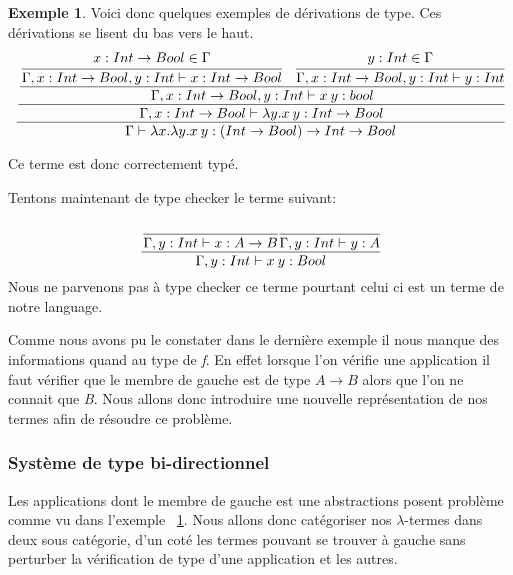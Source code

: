 \documentclass {article}
\theoremstyle{definition}
\newtheorem{example}{Exemple}
\theoremstyle{remark}
\begin{document}
\begin{example}
  \label{probleme:type_simple}
  Voici donc quelques exemples de dérivations de type.
  Ces dérivations se lisent du bas vers le haut.
  \begin{align*}
    \cfrac{
      \cfrac{
        \cfrac{
          \cfrac{x:Int\rightarrow Bool \in \Gamma}{\Gamma,x:Int\rightarrow Bool,y:Int\vdash x:Int\rightarrow Bool}\:\:\:\:%
          \cfrac{y:Int\in \Gamma}{\Gamma,x:Int\rightarrow Bool,y:Int\vdash y:Int}%
        }{\Gamma,x:Int\rightarrow Bool,y:Int\vdash \App{x}{y} : bool}%
      }{\Gamma,x:Int\rightarrow Bool\vdash \Lam{y}{\App{x}{y}}:Int \rightarrow Bool}%
    }{\Gamma\vdash \Lam{x}{\Lam{y}{\App{x}{y}}}:(Int\rightarrow Bool) \rightarrow Int \rightarrow Bool} %
  \end{align*}

  Ce terme est donc correctement typé.

  Tentons maintenant de type checker le terme suivant:
  \begin{align*}
    \cfrac{
      \cfrac{}{\Gamma,y:Int\vdash x:A\rightarrow B}%
      \cfrac{}{\Gamma,y:Int\vdash y:A}%
    }{\Gamma,y:Int\vdash\App{x}{y}:Bool}%
  \end{align*}
  Nous ne parvenons pas à type checker ce terme pourtant celui ci est un terme de notre language.
\end{example}

Comme nous avons pu le constater dans le dernière exemple il nous manque des informations
quand au type de \emph{f}. En effet lorsque l'on vérifie une application il faut 
vérifier que le membre de gauche est de type $A \rightarrow B$ alors que l'on ne connait 
que \emph{B}. Nous allons donc introduire une nouvelle représentation de nos termes 
afin de résoudre ce problème.

\subsubsection{Système de type bi-directionnel}

Les applications dont le membre de gauche est une abstractions posent problème comme vu dans l'exemple ~\ref{probleme:type_simple}.
Nous allons donc catégoriser nos \(\lambda\)-termes dans deux sous catégorie, 
d'un coté les termes pouvant se trouver à gauche sans perturber la vérification de type d'une application et les autres.
\end{document}
